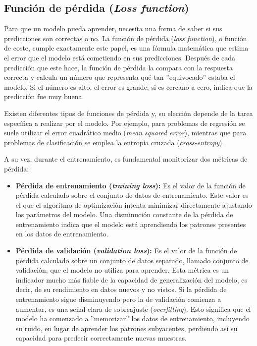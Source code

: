 \subsection{Función de pérdida (\textit{Loss function})}

Para que un modelo pueda aprender, necesita una forma de saber si sus predicciones son correctas o no. La función de pérdida (\textit{loss function}), o función de coste, cumple exactamente este papel, es una fórmula matemática que estima el error que el modelo está cometiendo en sus predicciones. Después de cada predicción que este hace, la función de pérdida la compara con la respuesta correcta y calcula un número que representa qué tan ''equivocado'' estaba el modelo. Si el número es alto, el error es grande; si es cercano a cero, indica que la predicción fue muy buena.

Existen diferentes tipos de funciones de pérdida y, su elección depende de la tarea específica a realizar por el modelo. Por ejemplo, para problemas de regresión se suele utilizar el error cuadrático medio (\textit{mean squared error}), mientras que para problemas de clasificación se emplea la entropía cruzada (\textit{cross-entropy}).

A su vez, durante el entrenamiento, es fundamental monitorizar dos métricas de pérdida:

\begin{itemize}
	\item \textbf{Pérdida de entrenamiento (\textit{training loss}):} Es el valor de la función de pérdida calculado sobre el conjunto de datos de entrenamiento. Este valor es el que el algoritmo de optimización intenta minimizar directamente ajustando los parámetros del modelo. Una disminución constante de la pérdida de entrenamiento indica que el modelo está aprendiendo los patrones presentes en los datos de entrenamiento.
	
	\item \textbf{Pérdida de validación (\textit{validation loss}):} Es el valor de la función de pérdida calculado sobre un conjunto de datos separado, llamado conjunto de validación, que el modelo no utiliza para aprender. Esta métrica es un indicador mucho más fiable de la capacidad de generalización del modelo, es decir, de su rendimiento en datos nuevos y no vistos. Si la pérdida de entrenamiento sigue disminuyendo pero la de validación comienza a aumentar, es una señal clara de sobreajuste (\textit{overfitting}). Esto significa que el modelo ha comenzado a ''memorizar'' los datos de entrenamiento, incluyendo su ruido, en lugar de aprender los patrones subyacentes, perdiendo así su capacidad para predecir correctamente nuevas muestras.
\end{itemize}

